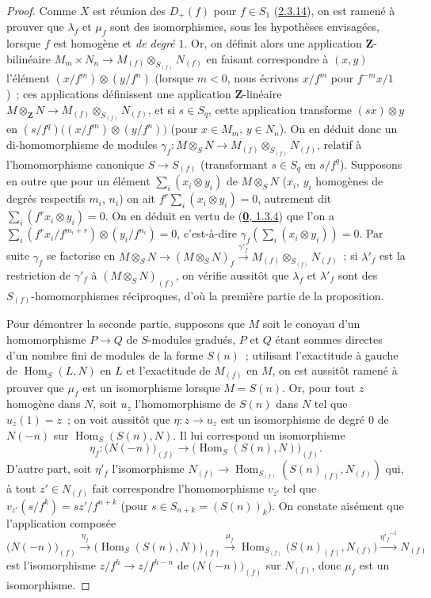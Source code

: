 \begin{proof}
Comme $X$ est réunion des $D_+(f)$ pour $f\in S_1$
(\hyperref[II.2.3.14-fr]{2.3.14}), on est ramené à prouver que $\lambda_f$
et $\mu_f$ sont des isomorphismes, sous les hypothèses envisagées, lorsque
$f$ est homogène et \emph{de degré $1$}. Or, on définit alors une
application $\mathbf{Z}$-bilinéaire
$M_m\times N_n\longrightarrow M_{(f)}\otimes_{S_{(f)}}N_{(f)}$
en faisant correspondre à $(x,y)$ l'élément
$(x/f^m)\otimes(y/f^n)$ (lorsque $m<0$, nous écrivons $x/f^m$ pour
$f^{-m}x/1$)~; ces applications définissent une application
$\mathbf{Z}$-linéaire
$M\otimes_{\mathbf{Z}}N\longrightarrow M_{(f)}\otimes_{S_{(f)}}N_{(f)}$,
et si $s\in S_q$, cette application transforme $(sx)\otimes y$ en
$(s/f^q)\bigl((x/f^m)\otimes(y/f^n)\bigr)$
(pour $x\in M_m$, $y\in N_n$). On en déduit donc un di-homomorphisme de
modules
$\gamma_f:M\otimes_S N\longrightarrow M_{(f)}\otimes_{S_{(f)}}N_{(f)}$,
relatif à l'homomorphisme canonique $S\to S_{(f)}$ (transformant
$s\in S_q$ en $s/f^q$). Supposons en outre que pour un élément
$\sum_i(x_i\otimes y_i)$ de $M\otimes_S N$ ($x_i$, $y_i$ homogènes de
degrés respectifs $m_i$, $n_i$) on ait
$f^r\sum_i(x_i\otimes y_i)=0$,
autrement dit $\sum_i(f^rx_i\otimes y_i)=0$. On en déduit en vertu de
(\hyperref[0.1.3.4-fr]{\textbf{0}, 1.3.4}) que l'on a
$\sum_i(f^rx_i/f^{m_i+r})\otimes(y_i/f^{n_i})=0$,
c'est-à-dire $\gamma_f(\sum_i(x_i\otimes y_i))=0$. Par suite $\gamma_f$
se factorise en
$M\otimes_S N\longrightarrow(M\otimes_S N)_f\xrightarrow{\gamma'_f}M_{(f)}\otimes_{S_{(f)}}N_{(f)}$~;
si $\lambda'_f$ est la restriction de $\gamma'_f$
à $(M\otimes_S N)_{(f)}$, on vérifie aussitôt que $\lambda_f$ et
$\lambda'_f$ sont des $S_{(f)}$-homomorphismes réciproques, d'où la
première partie de la proposition.

Pour démontrer la seconde partie, supposons que $M$ soit le conoyau d'un
homomorphisme $P\to Q$ de $S$-modules gradués, $P$ et $Q$ étant sommes
directes d'un nombre fini de modules de la forme $S(n)$~; utilisant
l'exactitude à gauche de $\operatorname{Hom}_S(L,N)$ en $L$ et l'exactitude
de $M_{(f)}$ en $M$, on est aussitôt ramené à prouver que $\mu_f$ est un
isomorphisme lorsque $M=S(n)$. Or, pour tout $z$ homogène dans $N$, soit
$u_z$ l'homomorphisme de $S(n)$ dans $N$ tel que $u_z(1)=z$~; on voit
aussitôt que $\eta:z\to u_z$ est un isomorphisme de degré $0$ de
$N(-n)$ sur $\operatorname{Hom}_S(S(n),N)$. Il lui correspond un
isomorphisme
\[
  \eta_f:\bigl(N(-n)\bigr)_{(f)}
  \longrightarrow
  \bigl(\operatorname{Hom}_S(S(n),N)\bigr)_{(f)}.
\]
D'autre part, soit $\eta'_f$ l'isomorphisme
$N_{(f)}\to\operatorname{Hom}_{S_{(f)}}(S(n)_{(f)},N_{(f)})$
qui, à tout $z'\in N_{(f)}$ fait correspondre l'homomorphisme $v_{z'}$ tel
que $v_{z'}(s/f^k)=sz'/f^{n+k}$ (pour
$s\in S_{n+k}=(S(n))_k$). On constate aisément que l'application composée
\[
  \bigl(N(-n)\bigr)_{(f)}
  \xrightarrow{\eta_f}
  \bigl(\operatorname{Hom}_S(S(n),N)\bigr)_{(f)}
  \xrightarrow{\mu_f}
  \operatorname{Hom}_{S_{(f)}}\bigl(S(n)_{(f)},N_{(f)}\bigr)
  \xrightarrow{{\eta'_f}^{-1}}N_{(f)}
\]
est l'isomorphisme $z/f^h\to z/f^{h-n}$ de
$\bigl(N(-n)\bigr)_{(f)}$ sur $N_{(f)}$, donc $\mu_f$ est un isomorphisme.
\end{proof}

